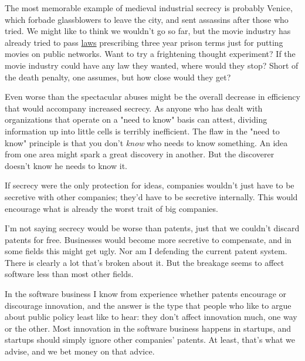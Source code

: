 The
                  most memorable example of medieval industrial secrecy is
                  probably Venice, which forbade glassblowers to leave the city,
                  and sent assassins after those who tried. We might like to
                  think we wouldn't go so far, but the movie industry has
                  already tried to pass
                  \href{http://news.com.com/2100-1026\_3-5106684.html}{laws}
                  prescribing three year prison terms just for putting movies on
                  public networks. Want to try a frightening thought experiment?
                  If the movie industry could have any law they wanted, where
                  would they stop? Short of the death penalty, one assumes, but
                  how close would they get?

Even worse than the
                  spectacular abuses might be the overall decrease in efficiency
                  that would accompany increased secrecy. As anyone who has
                  dealt with organizations that operate on a "need to know"
                  basis can attest, dividing information up into little cells is
                  terribly inefficient. The flaw in the "need to know" principle
                  is that you don't \emph{know} who needs to know something. An
                  idea from one area might spark a great discovery in another.
                  But the discoverer doesn't know he needs to know it.

If
                  secrecy were the only protection for ideas, companies wouldn't
                  just have to be secretive with other companies; they'd have to
                  be secretive internally. This would encourage what is already
                  the worst trait of big companies.

I'm not saying
                  secrecy would be worse than patents, just that we couldn't
                  discard patents for free. Businesses would become more
                  secretive to compensate, and in some fields this might get
                  ugly. Nor am I defending the current patent system. There is
                  clearly a lot that's broken about it. But the breakage seems
                  to affect software less than most other fields.

In
                  the software business I know from experience whether patents
                  encourage or discourage innovation, and the answer is the type
                  that people who like to argue about public policy least like
                  to hear: they don't affect innovation much, one way or the
                  other. Most innovation in the software business happens in
                  startups, and startups should simply ignore other companies'
                  patents. At least, that's what we advise, and we bet money on
                  that advice.


